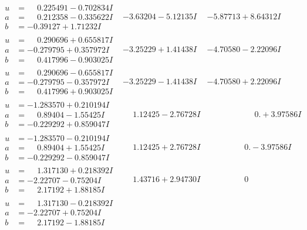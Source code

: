 \documentclass[1p]{elsarticle_modified}
\theoremstyle{definition}
\begin{document}
$$\begin{array}{c|c|c}
\begin{aligned}
u &= \phantom{-}0.225491 - 0.702834 I \\
a &= \phantom{-}0.212358 - 0.335622 I \\
b &= -0.39127 + 1.71232 I\end{aligned}
 & -3.63204 - 5.12135 I & -5.87713 + 8.64312 I \\ \hline\begin{aligned}
u &= \phantom{-}0.290696 + 0.655817 I \\
a &= -0.279795 + 0.357972 I \\
b &= \phantom{-}0.417996 - 0.903025 I\end{aligned}
 & -3.25229 + 1.41438 I & -4.70580 - 2.22096 I \\ \hline\begin{aligned}
u &= \phantom{-}0.290696 - 0.655817 I \\
a &= -0.279795 - 0.357972 I \\
b &= \phantom{-}0.417996 + 0.903025 I\end{aligned}
 & -3.25229 - 1.41438 I & -4.70580 + 2.22096 I \\ \hline\begin{aligned}
u &= -1.283570 + 0.210194 I \\
a &= \phantom{-}0.89404 - 1.55425 I \\
b &= -0.229292 + 0.859047 I\end{aligned}
 & \phantom{-}1.12425 - 2.76728 I & \phantom{-0.000000 -}0. + 3.97586 I \\ \hline\begin{aligned}
u &= -1.283570 - 0.210194 I \\
a &= \phantom{-}0.89404 + 1.55425 I \\
b &= -0.229292 - 0.859047 I\end{aligned}
 & \phantom{-}1.12425 + 2.76728 I & \phantom{-0.000000 } 0. - 3.97586 I \\ \hline\begin{aligned}
u &= \phantom{-}1.317130 + 0.218392 I \\
a &= -2.22707 - 0.75204 I \\
b &= \phantom{-}2.17192 + 1.88185 I\end{aligned}
 & \phantom{-}1.43716 + 2.94730 I & \phantom{-0.000000 } 0 \\ \hline\begin{aligned}
u &= \phantom{-}1.317130 - 0.218392 I \\
a &= -2.22707 + 0.75204 I \\
b &= \phantom{-}2.17192 - 1.88185 I\end{aligned}

\end{array}$$
\end{document}
